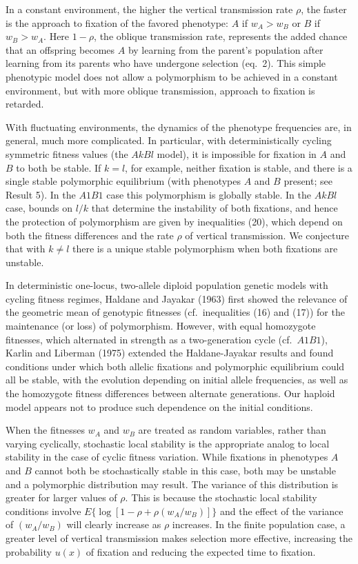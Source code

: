 In a constant environment, the higher the vertical transmission rate $\rho$, the faster is the approach to fixation of the favored phenotype: $A$ if $w_A>w_B$ or $B$ if $w_B>w_A$. Here $1-\rho$, the oblique transmission rate, represents the added chance that an offspring becomes $A$ by learning from the parent's population after learning from its parents who have undergone selection (eq.\ 2). This simple phenotypic model does not allow a polymorphism to be achieved in a constant environment, but with more oblique transmission, approach to fixation is retarded.

 With fluctuating environments, the dynamics of the phenotype frequencies are, in general, much more complicated. In particular, with deterministically cycling symmetric fitness values (the $AkBl$ model), it is impossible for fixation in $A$ and $B$ to both be stable. If $k=l$, for example, neither fixation is stable, and there is a single stable polymorphic equilibrium (with phenotypes $A$ and $B$ present; see Result 5). In the $A1B1$ case this  polymorphism is globally stable. In the $AkBl$ case, bounds on $l/k$ that determine the instability of both fixations, and hence the protection of polymorphism are given by inequalities (20), which depend on both the fitness differences and the rate $\rho$ of vertical transmission. We conjecture that with $k\ne l$ there is a unique stable polymorphism when both fixations are unstable.
 
 In deterministic one-locus, two-allele diploid population genetic models with cycling fitness regimes, Haldane and Jayakar (1963) first showed the relevance of the geometric mean of genotypic fitnesses (cf.\ inequalities (16) and (17)) for the maintenance (or loss) of polymorphism. However, with equal homozygote fitnesses, which alternated in strength as a two-generation cycle (cf.\ $A1B1$), Karlin and Liberman (1975) extended the Haldane-Jayakar results and found conditions under which both allelic fixations and polymorphic equilibrium could all be stable, with the evolution depending on initial allele frequencies, as well as the homozygote fitness differences between alternate generations. Our haploid model appears not to produce such dependence on the initial conditions.
 
 When the fitnesses $w_A$ and $w_B$ are treated as random variables, rather than varying cyclically, stochastic local stability is the appropriate analog to local stability in the case of cyclic fitness variation. While fixations in phenotypes $A$ and $B$ cannot both be stochastically stable in this case, both may be unstable and a polymorphic distribution may result. The variance of this distribution is greater for larger values of $\rho$. This is because the  stochastic local stability conditions involve $E\bigl\{\log[1-\rho+\rho(w_A/w_B)]\bigr\}$ and the effect of the variance of $(w_A/w_B)$ will clearly increase as $\rho$ increases. In the finite population case, a greater level of vertical transmission makes selection more effective, increasing the probability $u(x)$ of fixation and reducing the expected time to fixation.
 
